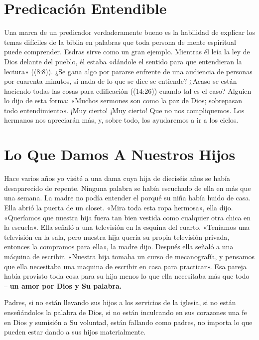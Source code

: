 \documentclass[12pt, twoside, openright]{book}
\begin{document}
\section{Predicación Entendible}
Una marca de un predicador verdaderamente bueno es la habilidad de explicar los temas difíciles de la biblia en palabras que toda persona de mente espiritual puede comprender. Esdras sirve como un gran ejemplo. Mientras él leía la ley de Dios delante del pueblo, él estaba «dándole el sentido para que entendieran la lectura» ((8:8)). ¿Se gana algo por pararse enfrente de una audiencia de personas por cuarenta minutos, si nada de lo que se dice se entiende? ¿Acaso se están haciendo todas las cosas para edificación ((14:26)) cuando tal es el caso? Alguien lo dijo de esta forma: «Muchos sermones son como la paz de Dios; sobrepasan todo entendimiento». ¡Muy cierto! ¡Muy cierto! Que no nos compliquemos. Los hermanos nos apreciarán más, y, sobre todo, los ayudaremos a ir a los cielos.

\section{Lo Que Damos A Nuestros Hijos}
Hace varios años yo visité a una dama cuya hija de dieciséis años se había desaparecido de repente. Ninguna palabra se había escuchado de ella en más que una semana. La madre no podía entender el porqué su niña había huido de casa. Ella abrió la puerta de un closet. «Mira toda esta ropa hermosa», ella dijo. «Queríamos que nuestra hija fuera tan bien vestida como cualquier otra chica en la escuela». Ella señaló a una televisión en la esquina del cuarto. «Teníamos una televisión en la sala, pero nuestra hija quería su propia televisión privada, entonces la compramos para ella», la madre dijo. Después ella señaló a una máquina de escribir. «Nuestra hija tomaba un curso de mecanografía, y pensamos que ella necesitaba una maquina de escribir en casa para practicar». Esa pareja había provisto toda cosa para su hija menos lo que ella necesitaba más que todo – \textbf{un amor por Dios y Su palabra.} 

Padres, si no están llevando sus hijos a los servicios de la iglesia, si no están enseñándolos la palabra de Dios, si no están inculcando en sus corazones una fe en Dios y sumisión a Su voluntad, están fallando como padres, no importa lo que pueden estar dando a sus hijos materialmente.

\backmatter
\clearpage
{}
\renewcommand*{\BRbooktitlestyle}[1]{\textbf{#1}\nopagebreak} %
\printindex[scr]
\end{document}
